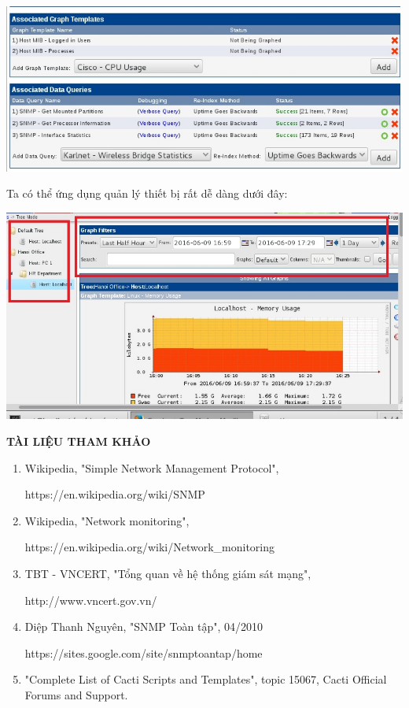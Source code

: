 \documentclass[12pt,oneside,a4paper,reqno]{report}
\begin{document}
\begin{large}
\begin{center}
	\includegraphics[scale=0.6]{images/cacti-danh-sach-monitor.jpg}\\
\end{center}
Ta có thể ứng dụng quản lý thiết bị rất dễ dàng dưới đây:
\begin{center}
	\includegraphics[scale=0.6]{images/cacti-quan-li-theo-lich.jpg}\\
\end{center}


\newpage
\vspace*{0.2cm}
\centerline{\Large\bf TÀI LIỆU THAM KHẢO}
\vspace*{0.5cm}

%
\begin{enumerate}
\item Wikipedia, "Simple Network Management Protocol",

https://en.wikipedia.org/wiki/SNMP
\item{Wikipedia, "Network monitoring",

https://en.wikipedia.org/wiki/Network\_monitoring}
\item{TBT - VNCERT, "Tổng quan về hệ thống giám sát mạng",

http://www.vncert.gov.vn/}
\item{Diệp Thanh Nguyên, "SNMP Toàn tập", 04/2010

https://sites.google.com/site/snmptoantap/home}
\item "Complete List of Cacti Scripts and Templates", topic 15067, Cacti Official Forums and Support.
\end{enumerate}
	
\end{large}		
\end{document}
